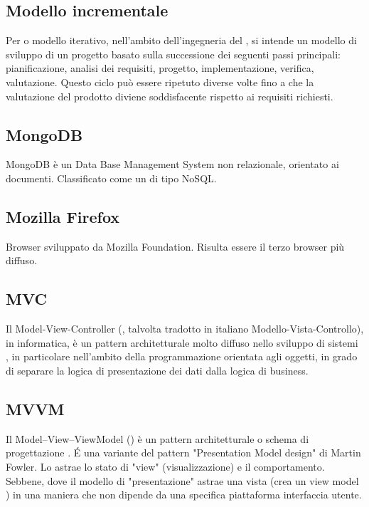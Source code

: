 \subsection{Modello incrementale}
Per  o modello iterativo, nell'ambito dell'ingegneria
del , si intende un modello di sviluppo di un progetto  basato sulla successione
dei seguenti passi principali: pianificazione, analisi dei requisiti, progetto, implementazione,
verifica, valutazione. Questo ciclo può essere ripetuto diverse volte fino a che la valutazione
del prodotto diviene soddisfacente rispetto ai requisiti richiesti.

\subsection{MongoDB}
MongoDB è un Data Base Management System non relazionale, orientato ai documenti. Classificato come un  di tipo NoSQL.

\subsection{Mozilla Firefox}
Browser   sviluppato da Mozilla Foundation. Risulta essere il terzo
browser più diffuso.

\subsection{MVC}
Il Model-View-Controller (, talvolta tradotto in italiano Modello-Vista-Controllo), in informatica, è un pattern architetturale molto diffuso nello sviluppo di sistemi , in particolare nell'ambito della programmazione orientata agli oggetti, in grado di separare la logica di presentazione dei dati dalla logica di business.

\subsection{MVVM}
Il Model–View–ViewModel () è un pattern  architetturale o schema di progettazione . É una variante del pattern "Presentation Model design" di Martin Fowler. Lo  astrae lo stato di "view" (visualizzazione) e il comportamento. Sebbene, dove il modello di "presentazione" astrae una vista (crea un view model ) in una maniera che non dipende da una specifica piattaforma interfaccia utente.

\newpage

